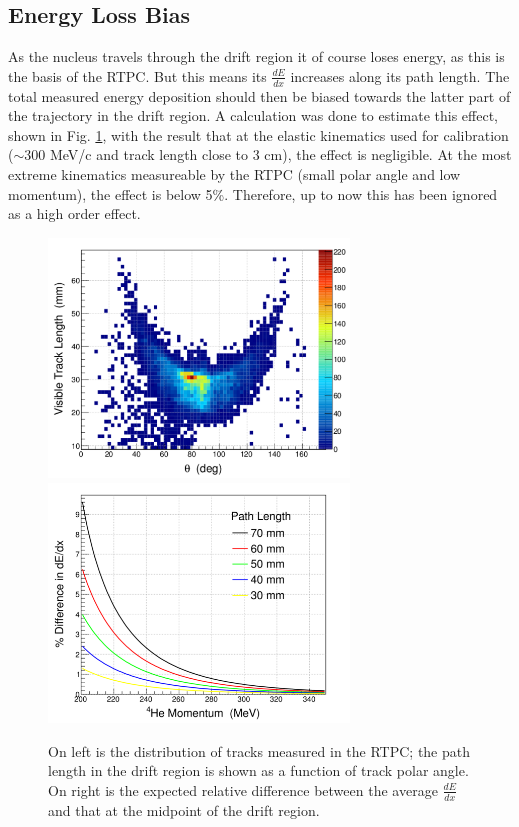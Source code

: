 \documentclass[amsmath,amssymb,notitlepage,12pt]{revtex4-1}
\begin{document}
\subsection{Energy Loss Bias}
As the nucleus travels through the drift region it of course loses energy, as this is the basis of the RTPC.  But this means its $\frac{dE}{dx}$ increases along its path length.  The total measured energy deposition should then be biased towards the latter part of the trajectory in the drift region.  A calculation was done to estimate this effect, shown in Fig. \ref{fig:bias}, with the result that at the elastic kinematics used for calibration ($\sim$300 MeV/c and track length close to 3 cm), the effect is negligible.  At the most extreme kinematics measureable by the RTPC (small polar angle and low momentum), the effect is below 5\%.  Therefore, up to now this has been ignored as a high order effect.
\begin{figure}[htbp]\centering
    \includegraphics[width=8cm]{Vtl_theta_1gev.png}
    \includegraphics[width=8cm]{Biasbb_alpha.png}
    \caption{On left is the distribution of tracks measured in the RTPC;  the path length in the drift region is shown as a function of track polar angle.  On right is the expected relative difference between the average $\frac{dE}{dx}$ and that at the midpoint of the drift region.\label{fig:bias}}
\end{figure}



\end{document}
